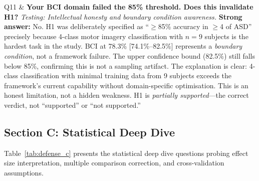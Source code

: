 \begin{xltabular}
Q11 & \textbf{Your BCI domain failed the 85\% threshold. Does this invalidate H1?} \newline
\textit{Testing: Intellectual honesty and boundary condition awareness.} \newline\newline
\textbf{Strong answer:} No. H1 was deliberately specified as ``$\geq$85\% accuracy in $\geq$4 of ASD'' precisely because 4-class motor imagery classification with $n = 9$ subjects is the hardest task in the study. BCI at 78.3\% [74.1\%--82.5\%] represents a \textit{boundary condition}, not a framework failure. The upper confidence bound (82.5\%) still falls below 85\%, confirming this is not a sampling artifact. The explanation is clear: 4-class classification with minimal training data from 9 subjects exceeds the framework's current capability without domain-specific optimisation. This is an honest limitation, not a hidden weakness. H1 is \textit{partially supported}---the correct verdict, not ``supported'' or ``not supported.'' \\

\end{xltabular}

\subsection{Section C: Statistical Deep Dive}

\noindent Table~\ref{tab:defense_c} presents the statistical deep dive questions probing effect size interpretation, multiple comparison correction, and cross-validation assumptions.

